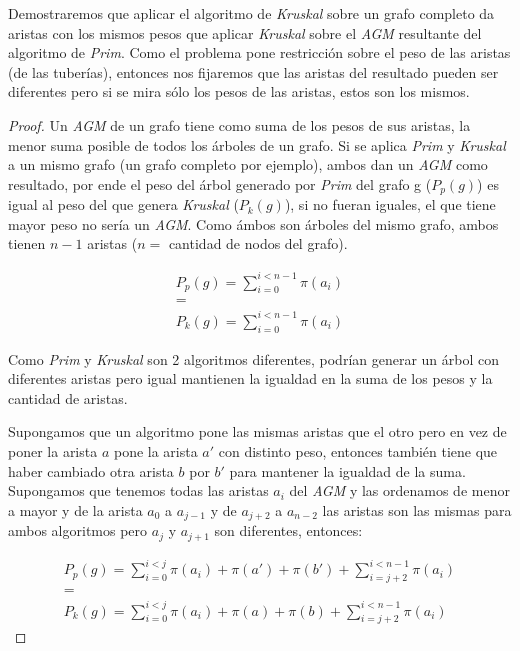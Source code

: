 Demostraremos que aplicar el algoritmo de \emph{Kruskal} sobre un grafo completo da aristas con los mismos pesos que aplicar \emph{Kruskal} sobre el \emph{AGM} resultante del algoritmo de \emph{Prim}. Como el problema pone restricci\'on sobre el peso de las aristas (de las tuber\'ias), entonces nos fijaremos que las aristas del resultado pueden ser diferentes pero si se mira s\'olo los pesos de las aristas, estos son los mismos.

\begin{proof}
	Un \emph{AGM} de un grafo tiene como suma de los pesos de sus aristas, la menor suma posible de todos los \'arboles de un grafo. Si se aplica \emph{Prim} y \emph{Kruskal} a un mismo grafo (un grafo completo por ejemplo), ambos dan un \emph{AGM} como resultado, por ende el peso del \'arbol generado por \emph{Prim} del grafo g ($P_p(g)$) es igual al peso del que genera \emph{Kruskal} ($P_k(g)$), si no fueran iguales, el que tiene mayor peso no ser\'ia un \emph{AGM}. Como \'ambos son \'arboles del mismo grafo, ambos tienen $n-1$ aristas ($n = $ cantidad de nodos del grafo).

	\begin{equation*}
	\begin{split}
		P_p(g) = \sum_{i = 0}^{i < n - 1} \pi(a_i)\\
		=\\
		P_k(g) = \sum_{i = 0}^{i < n - 1} \pi(a_i)
	\end{split}
	\end{equation*}

Como \emph{Prim} y \emph{Kruskal} son 2 algoritmos diferentes, podr\'ian generar un \'arbol con diferentes aristas pero igual mantienen la igualdad en la suma de los pesos y la cantidad de aristas.

Supongamos que un algoritmo pone las mismas aristas que el otro pero en vez de poner la arista $a$ pone la arista $a'$ con distinto peso, entonces tambi\'en tiene que haber cambiado otra arista $b$ por $b'$ para mantener la igualdad de la suma. Supongamos que tenemos todas las aristas $a_i$ del \emph{AGM} y las ordenamos de menor a mayor y de la arista $a_0$ a $a_{j-1}$ y de $a_{j+2}$ a $a_{n-2}$ las aristas son las mismas para ambos algoritmos pero $a_j$ y $a_{j+1}$ son diferentes, entonces:

	\begin{equation*}
	\begin{split}
		P_p(g) = \sum_{i = 0}^{i < j} \pi(a_i) + \pi(a') + \pi(b') + \sum_{i = j + 2}^{i < n - 1} \pi(a_i) \\
		=\\
		P_k(g) = \sum_{i = 0}^{i < j} \pi(a_i) + \pi(a) + \pi(b) + \sum_{i = j + 2}^{i < n - 1} \pi(a_i)
	\end{split}
	\end{equation*}


\end{proof}
